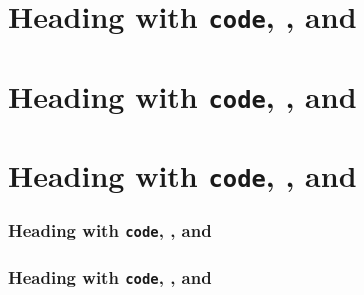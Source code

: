 \section{Heading with \texttt{code}, \cite{cite}, and \alpha}
\section{Heading with \texttt{code}, \cite{cite}, and \alpha}
\section{Heading with \texttt{code}, \cite{cite}, and \alpha}
\begin{frame}[t]
\frametitle{Heading with \texttt{code}, \cite{cite}, and \alpha}

\end{frame}

\begin{frame}[t]
\frametitle{Heading with \texttt{code}, \cite{cite}, and \alpha}

\end{frame}


